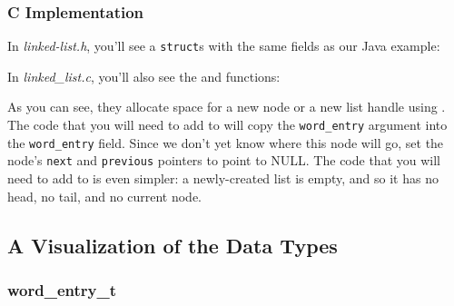 \subsubsection{C Implementation} \label{subsubsec:cImplementation}

In \textit{linked-list.h}, you'll see a \lstinline{struct}s with the same fields as our Java example:





In \textit{linked\_list.c}, you'll also see the  and  functions:





As you can see, they allocate space for a new node or a new list handle using .
The code that you will need to add to  will copy the \lstinline{word_entry} argument into the \lstinline{word_entry} field.
Since we don't yet know where this node will go, set the node's \lstinline{next} and \lstinline{previous} pointers to point to NULL\@.
The code that you will need to add to  is even simpler: a newly-created list is empty, and so it has no head, no tail, and no current node.


\subsection{A Visualization of the Data Types}

\subsubsection{word\_entry\_t}


